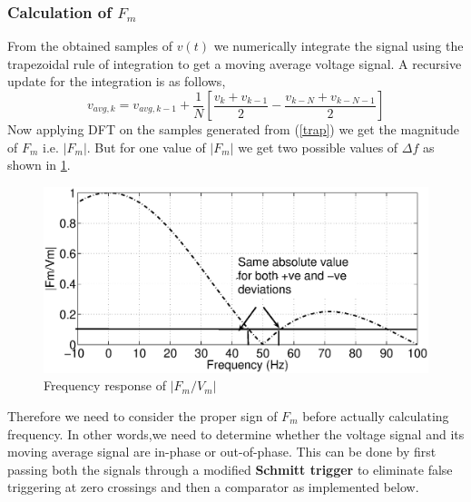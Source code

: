 \subsubsection{Calculation of $F_m$}
From the obtained samples of $v(t)$ we numerically integrate the signal using the trapezoidal rule of integration to get a moving average voltage signal. A recursive update for the integration is as follows,
\begin{equation}
\label{trap}
v_{avg,k}=v_{avg,k-1}+\frac{1}{N}\left[\frac{v_{k}+v_{k-1}}{2} - \frac{v_{k-N}+v_{k-N-1}}{2}\right]
\end{equation}
Now applying DFT on the samples generated from (\ref{trap}) we get the magnitude of $F_m$ i.e. $|F_m|$. But for one value of $|F_m|$ we get two possible values of $\Delta f$ as shown in \figurename\ref{zoom}.
\begin{figure}[!t]
\centering
\includegraphics[scale=0.3]{abssincplot.eps}
\caption{Frequency response of  $|F_m/V_m|$}
\label{zoom}
\end{figure}
Therefore we need to consider the proper sign of $F_m$ before actually calculating frequency. In other words,we need to determine whether the voltage signal and its moving average signal are in-phase or out-of-phase. This can be done by first passing both the signals through a modified {\bf Schmitt trigger} to eliminate false triggering at zero crossings and then a comparator as implemented below.

